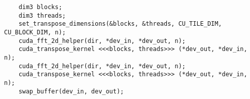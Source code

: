 \lstset{language=C++}
\begin{lstlisting}
    dim3 blocks;
    dim3 threads;
    set_transpose_dimensions(&blocks, &threads, CU_TILE_DIM, CU_BLOCK_DIM, n);    
    cuda_fft_2d_helper(dir, *dev_in, *dev_out, n);
    cuda_transpose_kernel <<<blocks, threads>>> (*dev_out, *dev_in, n);
    cuda_fft_2d_helper(dir, *dev_in, *dev_out, n);
    cuda_transpose_kernel <<<blocks, threads>>> (*dev_out, *dev_in, n);
    swap_buffer(dev_in, dev_out);
\end{lstlisting}